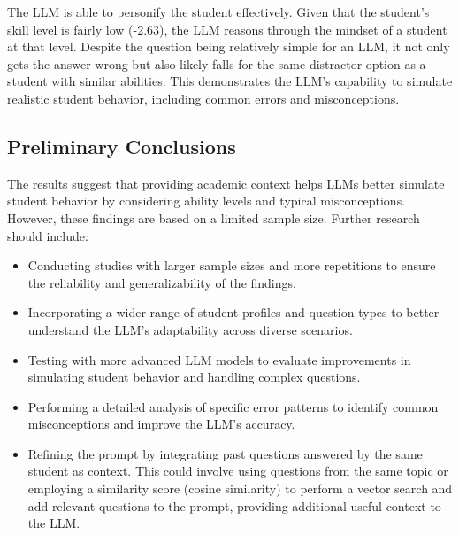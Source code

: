 \documentclass[
    a4paper, %
    10pt, %
    twoside, %
]{LTJournalArticle}
\begin{document}
The LLM is able to personify the student effectively. Given that the student's skill level is fairly low (-2.63), the LLM reasons through the mindset of a student at that level. Despite the question being relatively simple for an LLM, it not only gets the answer wrong but also likely falls for the same distractor option as a student with similar abilities. This demonstrates the LLM's capability to simulate realistic student behavior, including common errors and misconceptions.

\subsection{Preliminary Conclusions}
The results suggest that providing academic context helps LLMs better simulate student behavior by considering ability levels and typical misconceptions. However, these findings are based on a limited sample size. Further research should include:
\begin{itemize}
    \item Conducting studies with larger sample sizes and more repetitions to ensure the reliability and generalizability of the findings.
    \item Incorporating a wider range of student profiles and question types to better understand the LLM's adaptability across diverse scenarios.
    \item Testing with more advanced LLM models to evaluate improvements in simulating student behavior and handling complex questions.
    \item Performing a detailed analysis of specific error patterns to identify common misconceptions and improve the LLM's accuracy.
    \item Refining the prompt by integrating past questions answered by the same student as context. This could involve using questions from the same topic or employing a similarity score (cosine similarity) to perform a vector search and add relevant questions to the prompt, providing additional useful context to the LLM.
\end{itemize}




\printbibliography %

\end{document}
